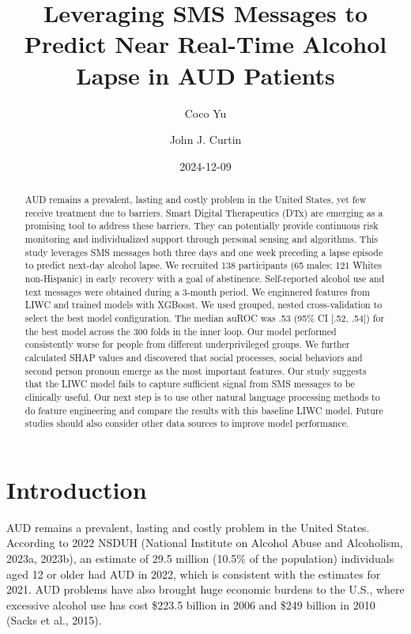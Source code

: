 \documentclass[
  letterpaper,
  DIV=11,
  numbers=noendperiod]{scrartcl}
\title{Leveraging SMS Messages to Predict Near Real-Time Alcohol Lapse
in AUD Patients}
\author{Coco Yu \and John J. Curtin}
\date{2024-12-09}
\begin{document}
\maketitle
\begin{abstract}
AUD remains a prevalent, lasting and costly problem in the United
States, yet few receive treatment due to barriers. Smart Digital
Therapeutics (DTx) are emerging as a promising tool to address these
barriers. They can potentially provide continuous risk monitoring and
individualized support through personal sensing and algorithms. This
study leverages SMS messages both three days and one week preceding a
lapse episode to predict next-day alcohol lapse. We recruited 138
participants (65 males; 121 Whites non-Hispanic) in early recovery with
a goal of abstinence. Self-reported alcohol use and text messages were
obtained during a 3-month period. We enginnered features from LIWC and
trained models with XGBoost. We used grouped, nested cross-validation to
select the best model configuration. The median auROC was .53 (95\% CI
{[}.52, .54{]}) for the best model across the 300 folds in the inner
loop. Our model performed consistently worse for people from different
underprivileged groups. We further calculated SHAP values and discovered
that social processes, social behaviors and second person pronoun emerge
as the most important features. Our study suggests that the LIWC model
fails to capture sufficient signal from SMS messages to be clinically
useful. Our next step is to use other natural language processing
methods to do feature engineering and compare the results with this
baseline LIWC model. Future studies should also consider other data
sources to improve model performance.
\end{abstract}


\section{Introduction}\label{introduction}

AUD remains a prevalent, lasting and costly problem in the United
States. According to 2022 NSDUH (National Institute on Alcohol Abuse and
Alcoholism, 2023a, 2023b), an estimate of 29.5 million (10.5\% of the
population) individuals aged 12 or older had AUD in 2022, which is
consistent with the estimates for 2021. AUD problems have also brought
huge economic burdens to the U.S., where excessive alcohol use has cost
\$223.5 billion in 2006 and \$249 billion in 2010 (Sacks et al., 2015).
\end{document}
